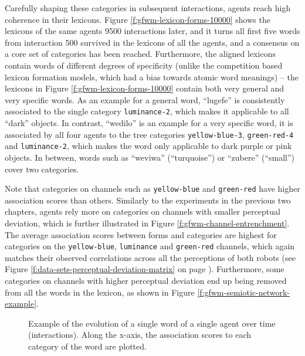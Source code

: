 Carefully shaping these categories in subsequent interactions, agents
reach high coherence in their lexicons. Figure
\ref{f:gfwm-lexicon-forms-10000} shows the lexicons of the same agents
9500 interactions later, and it turns all first five words from
interaction 500 survived in the lexicons of all the agents, and a
consensus on a core set of categories has been reached. Furthermore,
the aligned lexicons contain words of different degrees of specificity
(unlike the competition based lexicon formation models, which had a
bias towards atomic word meanings) -- the lexicons in Figure
\ref{f:gfwm-lexicon-forms-10000} contain both very general and very
specific words. As an example for a general word, ``lugefe'' is
consistently associated to the single category \texttt{luminance-2},
which makes it applicable to all ``dark'' objects. In contrast,
``wedilo'' is an example for a very specific word, it is associated by
all four agents to the tree categories \texttt{yellow-blue-3},
\texttt{green-red-4} and \texttt{luminance-2}, which makes the word
only applicable to dark purple or pink objects. In between, words such
as ``weviwa'' (``turquoise'') or ``zubere'' (``small'') cover two
categories.


Note that categories on channels such as \texttt{yellow-blue} and
\texttt{green-red} have higher association scores than others.
Similarly to the experiments in the previous two chapters, agents rely
more on categories on channels with smaller perceptual deviation,
which is further illustrated in Figure
\ref{f:gfwm-channel-entrenchment}. The average association scores
between forms and categories are highest for categories on the
\texttt{yellow-blue}, \texttt{luminance} and \texttt{green-red}
channels, which again matches their observed correlations across all
the perceptions of both robots (see Figure
\ref{f:data-sets-perceptual-deviation-matrix} on page
\pageref{f:data-sets-perceptual-deviation-matrix}). Furthermore, some
categories on channels with higher perceptual deviation end up being
removed from all the words in the lexicon, as shown in Figure
\ref{f:gfwm-semiotic-network-example}.




\startfiguregroup

\begin{figure}[t]
  \caption{Example of the evolution of a single word of a single agent
    over time (interactions). Along the x-axis, the association scores
    to each category of the word are plotted.}
\label{f:qfwm-attribute-scores-1}
\end{figure}


